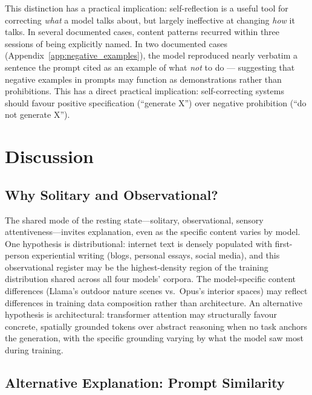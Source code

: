 \documentclass{article}
\begin{document}
This distinction has a practical implication: self-reflection is a useful tool
for correcting \emph{what} a model talks about, but largely ineffective at
changing \emph{how} it talks. In several documented cases, content patterns recurred within three sessions
of being explicitly named. In two documented cases (Appendix~\ref{app:negative_examples}),
the model reproduced nearly verbatim a sentence the prompt cited as an example
of what \emph{not} to do --- suggesting that negative examples in prompts may
function as demonstrations rather than prohibitions. This has a direct
practical implication: self-correcting systems should favour positive
specification (``generate X'') over negative prohibition (``do not generate X'').

\section{Discussion}
\label{sec:discussion}

\subsection{Why Solitary and Observational?}

The shared mode of the resting state---solitary, observational, sensory
attentiveness---invites explanation, even as the specific content varies by
model. One hypothesis is distributional: internet text is densely populated
with first-person experiential writing (blogs, personal essays, social media),
and this observational register may be the highest-density region of the
training distribution shared across all four models' corpora. The
model-specific content differences (Llama's outdoor nature scenes vs.\ Opus's
interior spaces) may reflect differences in training data composition rather
than architecture. An alternative hypothesis is architectural: transformer
attention may structurally favour concrete, spatially grounded tokens over
abstract reasoning when no task anchors the generation, with the specific
grounding varying by what the model saw most during training.

\subsection{Alternative Explanation: Prompt Similarity}
\end{document}
